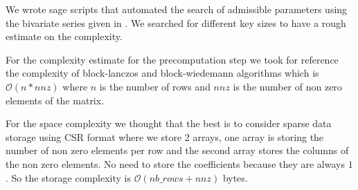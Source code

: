 \documentclass[english]{article}
\begin{document}
		We wrote sage scripts that automated the search of admissible parameters using the bivariate series given in \cite{VID24}. We searched for different key sizes to have a rough estimate on the complexity.
		
		For the complexity estimate for the precomputation step we took for reference the complexity of block-lanczos and block-wiedemann algorithms which is $\mathcal{O}(n*nnz)$ where $n$ is the number of rows and $nnz$ is the number of non zero elements of the matrix.
		
		For the space complexity we thought that the best is to consider sparse data storage using CSR format where we store 2 arrays, one array is storing the number of non zero elements per row and the second array stores the columns of the non zero elements. No need to store the coefficients because they are always $1$. So the storage complexity is $\mathcal{O}(nb\_rows + nnz)$ bytes.
		
		
\printbibliography
\end{document}
